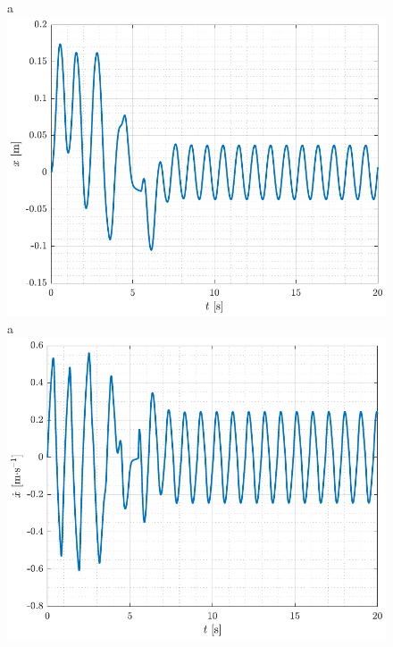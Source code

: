 %
\begin{figure}[H]
  \hspace{-10pt}
  \captionbox
  {
    a
    \label{fig:x_twinSwingAndCatch}
  }
  {
    \hspace{-1cm}
    \includegraphics[width=.4\textwidth]{figures/x_twinSwingAndCatch}
  }
  \hspace{20pt}
  \captionbox 
  {
    a
    \label{fig:xDot_twinSwingAndCatch}
  }
  {
    \hspace{-1cm}
    \includegraphics[width=.4\textwidth]{figures/xDot_twinSwingAndCatch}
  }  
\end{figure}
%
%
